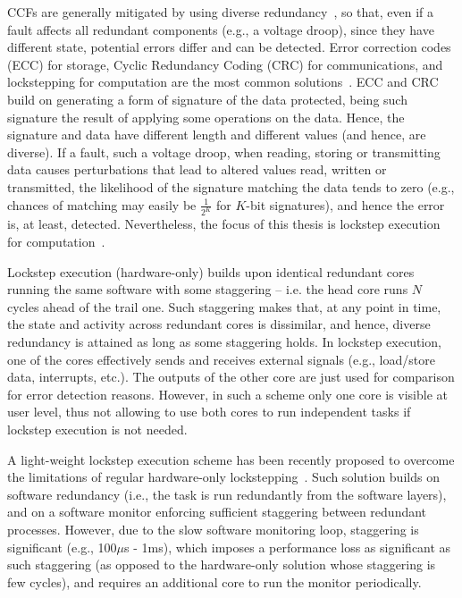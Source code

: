 CCFs are generally mitigated by using diverse redundancy~\cite{ClassicDiversity}, so that, even if a fault affects all redundant components (e.g., a voltage droop), since they have different state, potential errors differ and can be detected. Error correction codes (ECC) for storage, Cyclic Redundancy Coding (CRC) for communications, and lockstepping for computation are the most common solutions~\cite{SergiIOLTS}. ECC and CRC build on generating a form of signature of the data protected, being such signature the result of applying some operations on the data. Hence, the signature and data have different length and different values (and hence, are diverse). If a fault, such a voltage droop, when reading, storing or transmitting data causes perturbations that lead to altered values read, written or transmitted, the likelihood of the signature matching the data tends to zero (e.g., chances of matching may easily be $\frac{1}{2^K}$ for $K$-bit signatures), and hence the error is, at least, detected.
Nevertheless, the focus of this thesis is lockstep execution for computation~\cite{STlockstep,infineon_aurix,Iturbe2019,paper1}. 

Lockstep execution (hardware-only) builds upon identical redundant cores running the same software with some staggering -- i.e. the head core runs $N$ cycles ahead of the trail one. Such staggering makes that, at any point in time, the state and activity across redundant cores is dissimilar, and hence, diverse redundancy is attained as long as some staggering holds.
In lockstep execution, one of the cores effectively sends and receives external signals (e.g., load/store data, interrupts, etc.). The outputs of the other core are just used for comparison for error detection reasons. However, in such a scheme only one core is visible at user level, thus not allowing to use both cores to run independent tasks if lockstep execution is not needed.

A light-weight lockstep execution scheme has been recently proposed to overcome the limitations of regular hardware-only lockstepping~\cite{SergiDFT}. Such solution builds on software redundancy (i.e., the task is run redundantly from the software layers), and on a software monitor enforcing sufficient staggering between redundant processes. However, due to the slow software monitoring loop, staggering is significant (e.g., 100$\mu$s - 1ms), which imposes a performance loss as significant as such staggering (as opposed to the hardware-only solution whose staggering is few cycles), and requires an additional core to run the monitor periodically.

